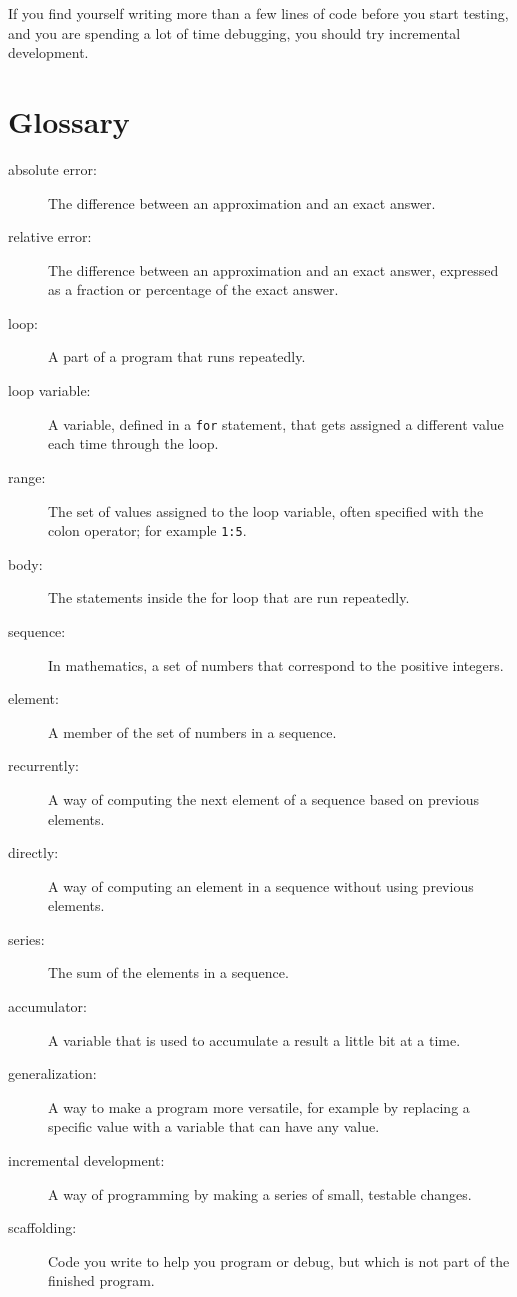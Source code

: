 \documentclass[
]{book}
\numberwithin{Answer}{chapter}
\numberwithin{Exercise}{chapter}
\begin{document}
If you find yourself writing more than a few lines of code before
you start testing, and you are spending a lot of time debugging,
you should try incremental development.


\section{Glossary}

\begin{description}

\item[absolute error:] The difference between an approximation and
an exact answer.

\item[relative error:] The difference between an approximation and
an exact answer, expressed as a fraction or percentage of the exact
answer.

\item[loop:] A part of a program that runs repeatedly.

\item[loop variable:] A variable, defined in a {\tt for} statement,
that gets assigned a different value each time through the loop.

\item[range:] The set of values assigned to the loop variable, often
specified with the colon operator; for example {\tt 1:5}.

\item[body:] The statements inside the for loop that are run
repeatedly.

\item[sequence:] In mathematics, a set of numbers that correspond
to the positive integers.

\item[element:] A member of the set of numbers in a sequence.

\item[recurrently:] A way of computing the next element of a sequence
based on previous elements.

\item[directly:] A way of computing an element in a sequence without
using previous elements.

\item[series:] The sum of the elements in a sequence.

\item[accumulator:] A variable that is used to accumulate a result
a little bit at a time.

\item[generalization:] A way to make a program more versatile, for
example by replacing a specific value with a variable that can have
any value.

\item[incremental development:] A way of programming by making a series
of small, testable changes.

\item[scaffolding:] Code you write to help you program or debug, but
which is not part of the finished program.

\end{description}
\end{document}
